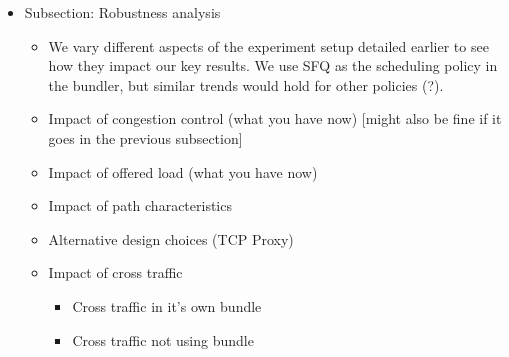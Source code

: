 {\begin{itemize}
    \begin{itemize}
        \item We use same set-up as before, but different scheduling and queue management polcies at the \name to meet different requirements. 
        \item Improved FCTs using FQ: Helps short flows achieve a smaller FCT by reducing the queuing delay that they see. Results already shown in previous subsection. 
        \item Smaller Queuing Delay using AQM: Helps keep queuing delay small. Present another FCT graph like Figure~\ref{fig:eval:best}, but with FQ-CoDel or PI. Also present a graph which shows the CDF of per-packet delays (if possible). Also, if possible (and if space), a comparison with properly configured and badly configured AQM scheme in the mahimahi link.
        \item Improved Rate Stability 
        \item Prioritizing interactive traffic
        \item anything else? 
    \end{itemize}
    \item Subsection: Robustness analysis
    \begin{itemize}
        \item We vary different aspects of the experiment setup detailed earlier to see how they impact our key results. We use SFQ as the scheduling policy in the bundler, but similar trends would hold for other policies (?). 
        \item Impact of congestion control (what you have now) [might also be fine if it goes in the previous subsection]
        \item Impact of offered load (what you have now)
        \item Impact of path characteristics
        \item Alternative design choices (TCP Proxy)
        \item Impact of cross traffic
        \begin{itemize}
            \item Cross traffic in it's own bundle
            \item Cross traffic not using bundle
        \end{itemize}
    \end{itemize}
\end{itemize}
\radhika{*/}
}
%
%

